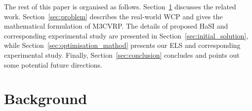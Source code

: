 \documentclass[journal]{IEEEtran}
\begin{document}
\def\oldversion{Out of the above-mentioned challenges and features of the problem, we mainly did the following work:
\begin{enumerate}
    \item We add some randomness to the traditional greedy algorithm to generate the initial solution population. The randomness we add here is to make the population diverse.
    \item We propose a new space-constrained swap operator which is better then the traditional swap operator in our problem.
    \item No one has ever considered such a large scale problem, We have given a direction to deal with this problem.
    \item The approach proposed in this paper can be approximated as a CVRP with same or less kind of constraints.
    \item We adaptive the MA framework to further perform algorithm optimisation.
\end{enumerate}
As we have seen, this is an extremely complex real-world problem with multi-depot, multi-trip and multi-disposal-facility constraints, and it is difficult to simplify. We used hierarchical approach including the heuristic-assisted population initialisation algorithm in the first part and adaptive MA together with improved operator of local search in the second part to do the experiments on this problem.
}


The rest of this paper is organised as follows. Section~\ref{sec:background} discusses the related work. Section~\ref{sec:problem} describes the real-world WCP and gives the mathematical formulation of M3CVRP. The details of proposed HaSI and corresponding experimental study are presented in Section~\ref{sec:initial_solution}, while Section~\ref{sec:optimisation_mathod} presents our ELS and corresponding experimental study. Finally, Section~\ref{sec:conclusion} concludes and points out some potential future directions.


\section{Background}\label{sec:background}
\end{document}
